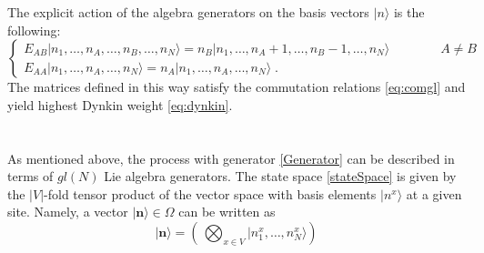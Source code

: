 \documentclass[10pt]{article}
\numberwithin{equation}{section}
\numberwithin{equation}{subsection}
\newcommand{\dt}{\;.}
\newcommand{\twoj}{\nu}
\begin{document}
The explicit action of the algebra generators on the basis  vectors $|n\rangle$ is the following:
\begin{equation}\label{actionE}
	\begin{cases}
		E_{AB}|n_{1},\ldots,n_{A},\ldots,n_{B},\ldots,n_{N}\rangle =n_{B}|n_{1},\ldots,n_{A}+1,\ldots,n_{B}-1,\ldots,n_{N}\rangle\qquad\qquad A\neq B\\[0.1cm]
		E_{AA}|n_{1},\ldots,n_{A},\ldots,n_{N}\rangle = n_{A} |n_{1},\ldots,n_{A},\ldots,n_{N}\rangle\dt
	\end{cases}
\end{equation}  
The matrices defined in this way satisfy the commutation relations \eqref{eq:comgl} and yield highest Dynkin weight \eqref{eq:dynkin}. \\
\\ \\
As mentioned above, the process with generator \eqref{Generator} can be described in terms of ${gl}(N)$ Lie algebra generators. The state space \eqref{stateSpace} is given by the $|V|$-fold tensor product of the vector space with basis elements $|n^x\rangle$ at a given site. Namely,
a vector $|{\bm{n}}\rangle \in \Omega$ can be written as
\begin{equation}
|{\bm{n}}\rangle=\left(\,\bigotimes_{x\in V}	|n_{1}^{x},\ldots,n_{N}^{x}\rangle\right)
\end{equation}
\end{document}
